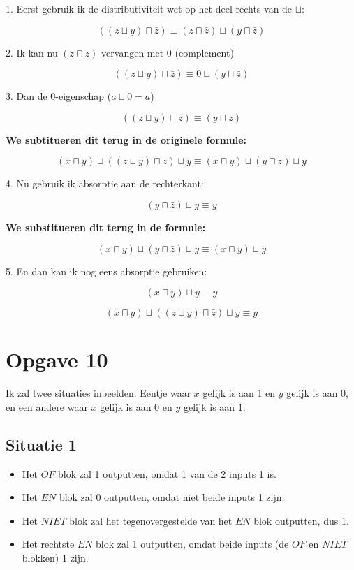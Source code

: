 \documentclass[11pt, a4paper]{article}
\begin{document}
1. Eerst gebruik ik de distributiviteit wet op het deel rechts van de $\sqcup$:


\[
((z \sqcup y) \sqcap \bar{z}) \equiv (z \sqcap \bar{z}) \sqcup (y \sqcap \bar{z})
\]

2. Ik kan nu $(z \sqcap z)$ vervangen met 0 (complement)

\[
((z \sqcup y) \sqcap \bar{z}) \equiv 0 \sqcup (y \sqcap \bar{z})
\]

3. Dan de 0-eigenschap ($a \sqcup 0 = a$)

\[
((z \sqcup y) \sqcap \bar{z}) \equiv (y \sqcap \bar{z})
\]

\textbf{We subtitueren dit terug in de originele formule:}

\[
(x \sqcap y) \sqcup ((z \sqcup y) \sqcap \bar{z}) \sqcup y \equiv (x \sqcap y) \sqcup (y \sqcap \bar{z} ) \sqcup y
\]

4. Nu gebruik ik absorptie aan de rechterkant:

\[
(y \sqcap \bar{z}) \sqcup y \equiv y
\]

\textbf{We substitueren dit terug in de formule:}

\[
(x \sqcap y) \sqcup (y \sqcap \bar{z} ) \sqcup y \equiv (x \sqcap y) \sqcup y
\]

5. En dan kan ik nog eens absorptie gebruiken:

\[
(x \sqcap y) \sqcup y \equiv y
\]

\[
\boxed{(x \sqcap y) \sqcup ((z \sqcup y) \sqcap \bar{z}) \sqcup y \equiv y}
\]


\pagebreak
\section*{Opgave 10}

Ik zal twee situaties inbeelden. Eentje waar $x$ gelijk is aan 1 en $y$ gelijk is aan 0, en een andere waar $x$ gelijk is aan 0 en $y$ gelijk is aan 1.

\subsection*{Situatie 1}

\begin{itemize}
	\item Het $\boxed{OF}$ blok zal 1 outputten, omdat 1 van de 2 inputs 1 is.
	\item Het $\boxed{EN}$ blok zal 0 outputten, omdat niet beide inputs 1 zijn.
	\item Het $\boxed{NIET}$ blok zal het tegenovergestelde van het $\boxed{EN}$ blok outputten, dus 1.
	\item Het rechtste $\boxed{EN}$ blok zal 1 outputten, omdat beide inputs (de $\boxed{OF}$ en $\boxed{NIET}$ blokken) 1 zijn. 
\end{itemize}
\end{document}
